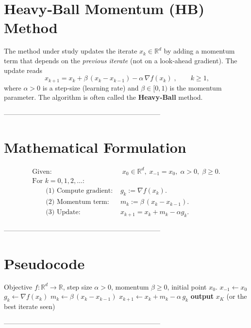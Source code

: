 \documentclass[11pt]{article}
\newcommand{\grad}{\nabla}
\newcommand{\R}{\mathbb{R}}
\begin{document}
\section*{Heavy‑Ball Momentum (HB) Method}

The method under study updates the iterate $x_k\in\R^d$ by adding a momentum term that depends on the \emph{previous iterate} (not on a look‑ahead gradient).  
The update reads
\[
\boxed{\;x_{k+1}=x_k+\beta\,(x_k-x_{k-1})-\alpha\,\grad f(x_k)\;},
\qquad k\ge 1,
\]
where $\alpha>0$ is a step‑size (learning rate) and $\beta\in[0,1)$ is the momentum parameter.  
The algorithm is often called the \textbf{Heavy‑Ball} method.

---------------------------------------------------------------------

\section*{Mathematical Formulation}
\begin{align}
\text{Given: }&\;x_0\in\R^d,\;x_{-1}=x_0,\;\alpha>0,\;\beta\ge 0. \nonumber\\[2mm]
\text{For }k=0,1,2,\dots:&\nonumber\\
\qquad\text{(1) Compute gradient: } & g_k:=\grad f(x_k). \nonumber\\
\qquad\text{(2) Momentum term: } & m_k:=\beta\,(x_k-x_{k-1}). \nonumber\\
\qquad\text{(3) Update: } & x_{k+1}=x_k+m_k-\alpha g_k . \nonumber
\end{align}

---------------------------------------------------------------------

\section*{Pseudocode}
\begin{algorithm}[H]
\caption{Heavy‑Ball Momentum}
\begin{algorithmic}[1]
\Require Objective $f:\R^d\!\to\!\R$, step size $\alpha>0$, momentum $\beta\ge0$, initial point $x_0$.
\State $x_{-1}\gets x_0$
    \State $g_k\gets \grad f(x_k)$
    \State $m_k\gets \beta\,(x_k-x_{k-1})$
    \State $x_{k+1}\gets x_k+m_k-\alpha\,g_k$
\EndFor
\State \textbf{output} $x_{K}$ (or the best iterate seen)
\end{algorithmic}
\end{algorithm}

---------------------------------------------------------------------
\end{document}
